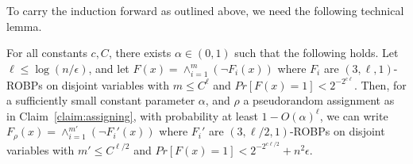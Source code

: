 To carry the induction forward as outlined above, we need the following technical lemma. 

\begin{claim}\label{claim:simplifyerror}
For all constants $c,C$, there exists $\alpha \in (0,1)$ such that the following holds. Let $\ell \leq \log(n/\epsilon)$, and let $F(x) = \wedge_{i=1}^m (\neg F_i(x))$ where $F_i$ are $(3,\ell,1)$-ROBPs on disjoint variables with $m \leq C^\ell$ and $Pr[F(x) = 1] < 2^{-2^{c \ell}}$. Then, for a sufficiently small constant parameter $\alpha$, and $\rho$ a pseudorandom assignment as in Claim~\ref{claim:assigning}, with probability at least $1 - O(\alpha)^{\ell}$, we can write $F_\rho(x) = \wedge_{i=1}^{m'} (\neg F_i'(x))$ where $F_i'$ are $(3,\ell/2,1)$-ROBPs on disjoint variables with $m' \leq C^{\ell/2}$ and $Pr[F(x) = 1] < 2^{-2^{c \ell/2}} + n^2 \epsilon$. 
\end{claim} 
